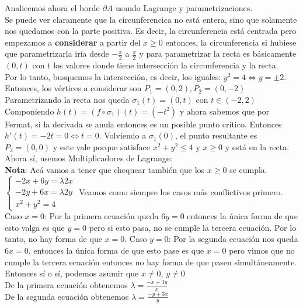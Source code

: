 \documentclass[10pt,a4paper]{article}
\begin{document}
Analicemos ahora el borde $\partial A$ usando Lagrange y parametrizaciones. \\
Se puede ver claramente que la circunferencica no está entera, sino que solamente nos quedamos con la parte positiva. Es decir, la circunferencia está centrada pero empezamos a \textbf{considerar} a partir del $x \ge 0$ entonces, la circunferencia si hubiese que parametrizarla iría desde $-\frac{\pi}{2}$ a $\frac{\pi}{2}$ y para parametrizar la recta es básicamente $(0, t)$ con t los valores donde tiene intersección la circunferencia y la recta. \\
Por lo tanto, busquemos la intersección, es decir, los iguales: $y^{2} = 4 \iff y = \pm 2$. Entonces, los vértices a considerar son $P_{1} = (0, 2), P_{2} = (0, -2)$ \\
Parametrizando la recta nos queda $\sigma_{1}(t) = (0, t)$ con $t \in (-2, 2)$ \\
Componiendo $h(t) = (f \circ \sigma_{1})(t) = (-t^{2})$ y ahora sabemos que por Fermat, si la derivada se anula entonces es un posible punto crítico. Entonces $h'(t) = -2t = 0 \iff t = 0$. Volviendo a $\sigma_{1}(0)$, el punto resultante es $P_{3} = (0,0)$ y este vale porque satisface $x^{2} + y^{2} \le 4$ y $x \ge 0$ y está en la recta. \\
Ahora sí, usemos Multiplicadores de Lagrange: \\
\textbf{Nota}: Acá vamos a tener que chequear también que los $x\ge 0$ se cumpla. \\
$\begin{cases}
    -2x+6y = \lambda 2x \\
    -2y+6x = \lambda 2y \\
    x^{2} + y^{2} = 4
\end{cases}$ 
Veamos como siempre los casos más conflictivos primero. \\
Caso $x = 0$: Por la primera ecuación queda $6y = 0$ entonces la única forma de que esto valga es que $y = 0$ pero si esto pasa, no se cumple la tercera ecuación. Por lo tanto, no hay forma de que $x = 0$. 
Caso $y = 0$: Por la segunda ecuación nos queda $6x = 0$, entonces la única forma de que esto pase es que $x = 0$ pero vimos que no cumple la tercera ecuación entonces no hay forma de que pasen simultáneamente. \\
Entonces sí o sí, podemos asumir que $x \neq 0$, $y \neq 0$ \\
De la primera ecuación obtenemos $\lambda = \frac{-x+3y}{x}$ \\
De la segunda ecuación obtenemos $\lambda = \frac{-y+3x}{y}$ \\
\end{document}
